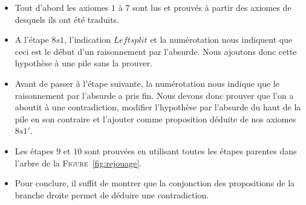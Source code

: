 \begin{itemize}
\item Tout d'abord les axiomes $1$ à $7$ sont lus et prouvés à partir des axiomes de \holfour desquels ils ont été traduits.
\item A l'étape $8s1$, l'indication $Leftsplit$ et la numérotation nous indiquent que ceci est le début d'un raisonnement par l'absurde. Nous ajoutons donc cette hypothèse à une pile sans la prouver.
\item Avant de passer à l'étape suivante, la numérotation nous indique que le raisonnement par l'absurde a pris fin. Nous devons donc prouver que l'on a aboutit à une contradiction, modifier l'hypothèse par l'absurde du haut de la pile en son contraire et l'ajouter comme proposition déduite de nos axiomes $8s1'$.
\item Les étapes $9$ et $10$ sont prouvées en utilisant toutes les étapes parentes dans l'arbre de la \textsc{Figure}~\ref{fig:rejouage}.
\item Pour conclure, il suffit de montrer que la conjonction des propositions de la branche droite permet de déduire une contradiction.
\end{itemize}





